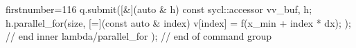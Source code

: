 \begin{cppcode*}{firstnumber=116}
        q.submit([&](auto & h) {
          const sycl::accessor v{v_buf, h};
          h.parallel_for(size, [=](const auto & index) {
            v[index] = f(x_min + index * dx);
          }); // end inner lambda/parallel_for
        }); // end of command group
\end{cppcode*}
